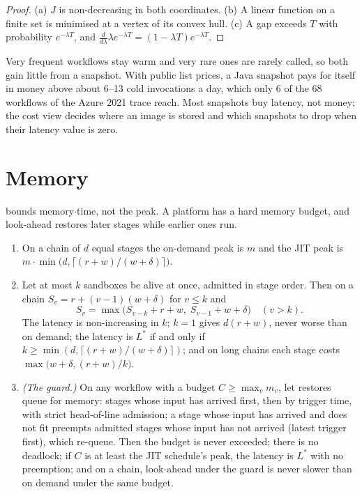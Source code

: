 \begin{proof}
(a) $J$ is non-decreasing in both coordinates. (b) A linear function on a finite set is
minimised at a vertex of its convex hull. (c) A gap exceeds $T$ with probability
$e^{-\lambda T}$, and $\frac{d}{d\lambda}\lambda e^{-\lambda T} = (1 - \lambda T)e^{-\lambda T}$.
\end{proof}

Very frequent workflows stay warm and very rare ones are rarely called, so both gain little
from a snapshot. With public list prices, a Java snapshot pays for itself in money above about
6--13 cold invocations a day, which only 6 of the 68 workflows of the Azure 2021 trace reach.
Most snapshots buy latency, not money; the cost view decides where an image is stored and which
snapshots to drop when their latency value is zero.

\section{Memory}
\label{sec:th-memory}

 bounds memory$\cdot$time, not the peak. A platform has a hard memory budget, and
look-ahead restores later stages while earlier ones run.

\begin{theorem}
\label{thm:memory}
\begin{enumerate}[label=(\alph*)]
  \item On a chain of $d$ equal stages the on-demand peak is $m$ and the JIT peak is
        $m \cdot \min\bigl(d, \lceil (r + w)/(w + \delta) \rceil\bigr)$.
  \item Let at most $k$ sandboxes be alive at once, admitted in stage order. Then on a chain
        $S_v = r + (v - 1)(w + \delta)$ for $v \le k$ and
        \[
          S_v = \max\bigl(S_{v-k} + r + w,\; S_{v-1} + w + \delta\bigr) \quad (v > k).
        \]
        The latency is non-increasing in $k$; $k = 1$ gives $d(r + w)$, never worse than on demand;
        the latency is $L^*$ if and only if $k \ge \min(d, \lceil (r + w)/(w + \delta) \rceil)$;
        and on long chains each stage costs $\max\bigl(w + \delta, (r + w)/k\bigr)$.
  \item \emph{(The guard.)} On any workflow with a budget $C \ge \max_v m_v$, let restores queue
        for memory: stages whose input has arrived first, then by trigger time, with strict
        head-of-line admission; a stage whose input has arrived and does not fit preempts
        admitted stages whose input has not arrived (latest trigger first), which re-queue.
        Then the budget is never exceeded; there is no deadlock; if $C$ is at least the JIT
        schedule's peak, the latency is $L^*$ with no preemption; and on a chain, look-ahead
        under the guard is never slower than on demand under the same budget.
\end{enumerate}
\end{theorem}

